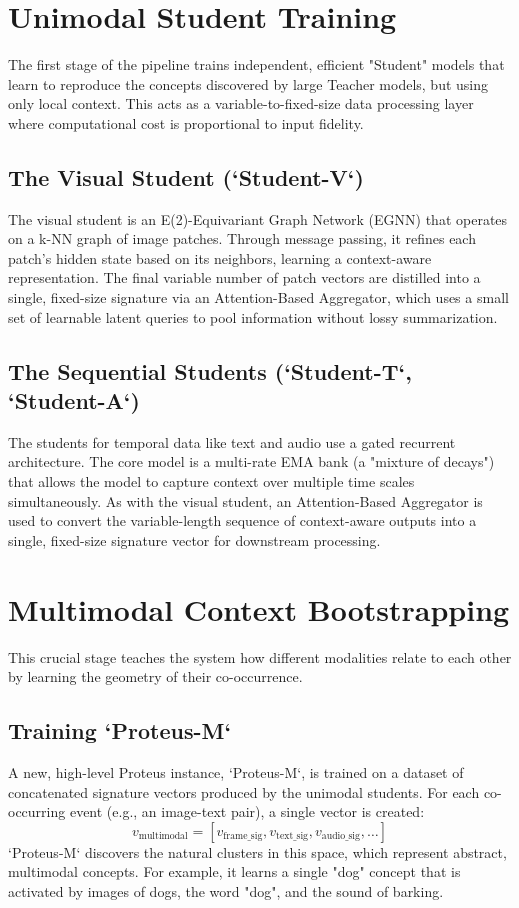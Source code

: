 \documentclass{article}
\begin{document}
\section{Unimodal Student Training}

The first stage of the pipeline trains independent, efficient "Student" models that learn to reproduce the concepts discovered by large Teacher models, but using only local context. This acts as a variable-to-fixed-size data processing layer where computational cost is proportional to input fidelity.

\subsection{The Visual Student (`Student-V`)}
The visual student is an E(2)-Equivariant Graph Network (EGNN) that operates on a k-NN graph of image patches. Through message passing, it refines each patch's hidden state based on its neighbors, learning a context-aware representation. The final variable number of patch vectors are distilled into a single, fixed-size signature via an Attention-Based Aggregator, which uses a small set of learnable latent queries to pool information without lossy summarization.

\subsection{The Sequential Students (`Student-T`, `Student-A`)}
The students for temporal data like text and audio use a gated recurrent architecture. The core model is a multi-rate EMA bank (a "mixture of decays") that allows the model to capture context over multiple time scales simultaneously. As with the visual student, an Attention-Based Aggregator is used to convert the variable-length sequence of context-aware outputs into a single, fixed-size signature vector for downstream processing.

\section{Multimodal Context Bootstrapping}

This crucial stage teaches the system how different modalities relate to each other by learning the geometry of their co-occurrence.

\subsection{Training `Proteus-M`}
A new, high-level Proteus instance, `Proteus-M`, is trained on a dataset of concatenated signature vectors produced by the unimodal students. For each co-occurring event (e.g., an image-text pair), a single vector is created:
$$ v_{\text{multimodal}} = [v_{\text{frame\_sig}}, v_{\text{text\_sig}}, v_{\text{audio\_sig}}, \dots] $$
`Proteus-M` discovers the natural clusters in this space, which represent abstract, multimodal concepts. For example, it learns a single "dog" concept that is activated by images of dogs, the word "dog", and the sound of barking.
\end{document}
